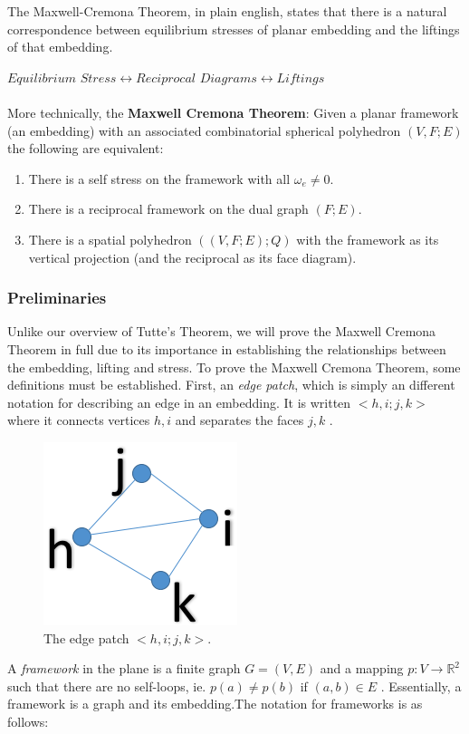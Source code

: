 \documentclass[11pt]{article}
\newcommand{\R}{\mathbb{R}}
\begin{document}
 The Maxwell-Cremona Theorem, in plain english, states that there is a natural correspondence between equilibrium stresses of planar embedding and the liftings of that embedding.
 
 $Equilibrium$  $Stress \leftrightarrow Reciprocal$ $Diagrams \leftrightarrow Liftings$ \\
\\
More technically, the \textbf{Maxwell Cremona Theorem}: Given a planar framework (an embedding) with an associated combinatorial spherical polyhedron $(V,F;E)$ the following are equivalent:
\begin{enumerate}
	\item There is a self stress on the framework with all $\omega_e \neq 0$.
	\item There is a reciprocal framework on the dual graph $(F;E)$.
	\item There is a spatial polyhedron $((V,F;E);Q)$ with the framework as its vertical projection (and the reciprocal as its face diagram).
 \end{enumerate}

 
\subsubsection{Preliminaries}
Unlike our overview of Tutte's Theorem, we will prove the Maxwell Cremona Theorem in full due to its importance in establishing the relationships between the embedding, lifting and stress. To prove the Maxwell Cremona Theorem, some definitions must be established. First, an \emph{edge patch}, which is simply an different notation for describing an edge in an embedding. It is written $<h,i;j,k>$ where it connects vertices $h,i$ and separates the faces $j,k$ \cite{mccProof}.

\begin{figure}
  \begin{center}
  		\includegraphics[width=.23\textwidth]{edge_patch2}
  \end{center}
  \caption{The edge patch $<h,i;j,k>$.}
\end{figure}
  
A \emph{framework} in the plane is a finite graph $G=(V,E)$ and a mapping $p: V \rightarrow \R^2$ such that there are no self-loops, ie. $p(a) \neq p(b)$ if $(a,b) \in E$ \cite{mccProof}. Essentially, a framework is a graph and its embedding.The notation for frameworks is as follows: 
\end{document}
